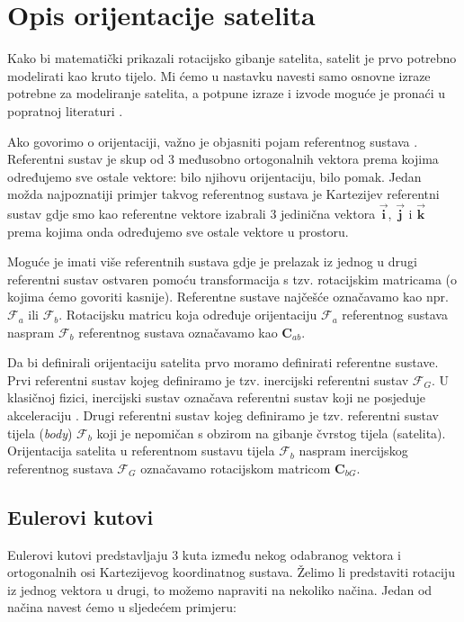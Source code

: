 \documentclass[times, utf8, diplomski, numeric]{templates/template}
\begin{document}
\chapter{Opis orijentacije satelita}{
    Kako bi matematički prikazali rotacijsko gibanje satelita, satelit je prvo potrebno modelirati kao kruto tijelo. Mi ćemo u nastavku navesti samo osnovne izraze potrebne za modeliranje satelita, a potpune izraze i izvode moguće je pronaći u popratnoj literaturi \cite{adcsKnjiga}.

    Ako govorimo o orijentaciji, važno je objasniti pojam referentnog sustava . Referentni sustav je skup od 3 međusobno ortogonalnih vektora prema kojima određujemo sve ostale vektore: bilo njihovu orijentaciju, bilo pomak. Jedan možda najpoznatiji primjer takvog referentnog sustava je Kartezijev referentni sustav gdje smo kao referentne vektore izabrali 3 jedinična vektora $\boldsymbol{\overrightarrow{i}}$, $\boldsymbol{\overrightarrow{j}}$ i $\boldsymbol{\overrightarrow{k}}$ prema kojima onda određujemo sve ostale vektore u prostoru. 

    Moguće je imati više referentnih sustava gdje je prelazak iz jednog u drugi referentni sustav ostvaren pomoću transformacija s tzv. rotacijskim matricama (o kojima ćemo govoriti kasnije). Referentne sustave najčešće označavamo kao npr. $\mathcal{F}_a$ ili $\mathcal{F}_b$. Rotacijsku matricu koja određuje orijentaciju $\mathcal{F}_a$ referentnog sustava naspram $\mathcal{F}_b$ referentnog sustava označavamo kao $\boldsymbol{C}_{ab}$.

    Da bi definirali orijentaciju satelita prvo moramo definirati referentne sustave. Prvi referentni sustav kojeg definiramo je tzv. inercijski referentni sustav $\mathcal{F}_G$. U klasičnoj fizici, inercijski sustav označava referentni sustav koji ne posjeduje akceleraciju \cite{inertialFrame}. Drugi referentni sustav kojeg definiramo je tzv. referentni sustav tijela (\emph{body}) $\mathcal{F}_b$ koji je nepomičan s obzirom na gibanje čvrstog tijela (satelita). Orijentacija satelita u referentnom sustavu tijela $\mathcal{F}_b$ naspram inercijskog referentnog sustava $\mathcal{F}_G$ označavamo rotacijskom matricom $\boldsymbol{C}_{bG}$.

    \section{Eulerovi kutovi}{
        Eulerovi kutovi predstavljaju 3 kuta između nekog odabranog vektora i ortogonalnih osi Kartezijevog koordinatnog sustava. Želimo li predstaviti rotaciju iz jednog vektora u drugi, to možemo napraviti na nekoliko načina. Jedan od načina navest ćemo u sljedećem primjeru:

}}
\end{document}
